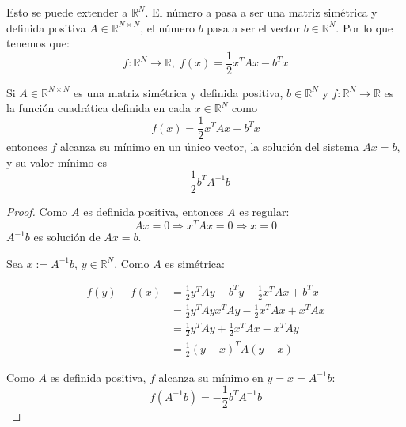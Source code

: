 Esto se puede extender a $\mathbb{R}^N$. El número a pasa a ser una matriz simétrica y definida positiva $A \in \mathbb{R}^{N \times N}$, el número $b$ pasa a ser el vector $b \in \mathbb{R}^N$. Por lo que tenemos que:
\[ f: \mathbb{R}^N \longrightarrow \mathbb{R}, \; f(x) = \frac{1}{2}x^TAx-b^Tx \]

\begin{nth}
Si $A \in \mathbb{R}^{N \times N}$ es una matriz simétrica y definida positiva, $b \in \mathbb{R}^N$ y $f: \mathbb{R}^N \longrightarrow \mathbb{R}$ es la función cuadrática definida en cada $x \in \mathbb{R}^N$ como
\[ f(x) = \frac{1}{2}x^TAx-b^Tx \]
entonces $f$ alcanza su mínimo en un único vector, la solución del sistema $Ax=b$, y su valor mínimo es
\[ - \frac{1}{2}b^TA^{-1}b \]
\end{nth}

\begin{proof}
Como $A$ es definida positiva, entonces $A$ es regular:
\[ Ax=0 \Rightarrow x^TAx=0 \Rightarrow x=0 \]
$A^{-1}b$ es solución de $Ax=b$.

Sea $x:=A^{-1}b$, $y \in \mathbb{R}^N$. Como $A$ es simétrica:

	\begin{equation*}
		\begin{split}
		f(y) - f(x) & = \frac{1}{2} y^TAy - b^Ty - \frac{1}{2}x^TAx + b^Tx \\
		& = \frac{1}{2}y^TAy  x^TAy - \frac{1}{2}x^TAx + x^TAx \\
		& = \frac{1}{2}y^TAy + \frac{1}{2}x^TAx - x^TAy \\
		& = \frac{1}{2}(y-x)^TA(y-x)
		\end{split}
	\end{equation*}
	
Como $A$ es definida positiva, $f$ alcanza su mínimo en $y=x=A^{-1}b$:
\[ f(A^{-1}b) = -\frac{1}{2}b^TA^{-1}b \]
	
\end{proof}

